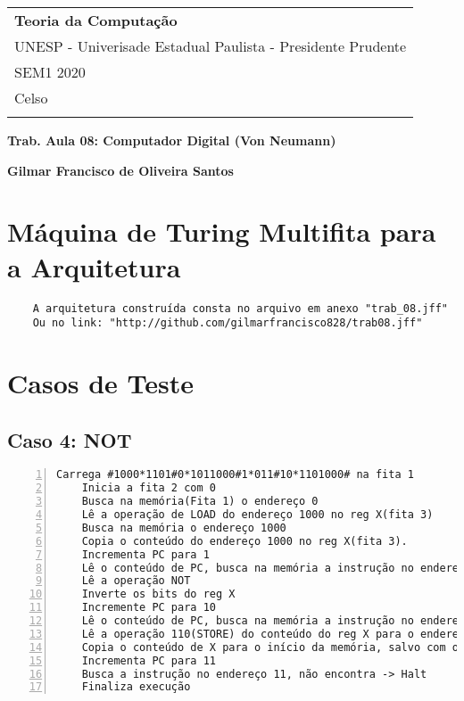 \documentclass[a4paper,12pt]{article}
\begin{document}
\thispagestyle{empty}

\begin{tabular}{p{15.5cm}}

{\large \bf Teoria da Computação} \\
UNESP - Univerisade Estadual Paulista - Presidente Prudente\\ SEM1 2020  \\ Celso\\
\hline
\\
\end{tabular}

\vspace*{0.3cm}

\begin{center} %
	{\Large \bf Trab. Aula 08: Computador Digital (Von Neumann)} %
	\vspace{2mm}

	{\bf Gilmar Francisco de Oliveira Santos} %

\end{center}

\vspace{0.4cm}

\section{Máquina de Turing Multifita para a Arquitetura}
\begin{verbatim}
    A arquitetura construída consta no arquivo em anexo "trab_08.jff"
    Ou no link: "http://github.com/gilmarfrancisco828/trab08.jff"
\end{verbatim}
\section{Casos de Teste}

\subsection*{Caso 4: NOT}
\begin{Verbatim}[numbers=left,xleftmargin=8mm]
    Carrega #1000*1101#0*1011000#1*011#10*1101000# na fita 1
    Inicia a fita 2 com 0
    Busca na memória(Fita 1) o endereço 0
    Lê a operação de LOAD do endereço 1000 no reg X(fita 3)
    Busca na memória o endereço 1000
    Copia o conteúdo do endereço 1000 no reg X(fita 3).
    Incrementa PC para 1
    Lê o conteúdo de PC, busca na memória a instrução no endereço 1
    Lê a operação NOT
    Inverte os bits do reg X
    Incremente PC para 10
    Lê o conteúdo de PC, busca na memória a instrução no endereço 10
    Lê a operação 110(STORE) do conteúdo do reg X para o endereço 1000
    Copia o conteúdo de X para o início da memória, salvo com o endereço 1000
    Incrementa PC para 11
    Busca a instrução no endereço 11, não encontra -> Halt
    Finaliza execução
\end{Verbatim}
\end{document}
